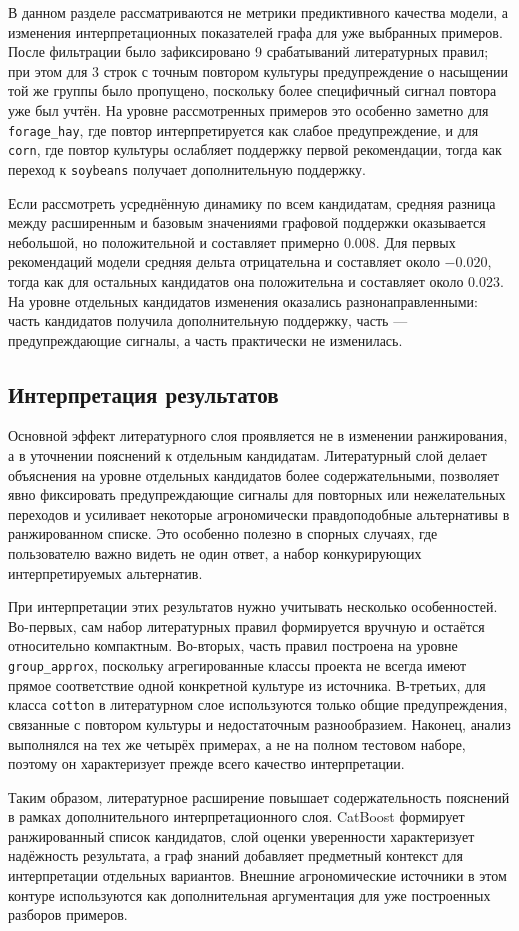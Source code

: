 

В данном разделе рассматриваются не метрики предиктивного качества модели, а изменения интерпретационных показателей
графа для уже выбранных примеров. После фильтрации было зафиксировано 9 срабатываний литературных правил; при этом для 3 строк с
точным повтором культуры предупреждение о насыщении той же группы было пропущено, поскольку более специфичный сигнал
повтора уже был учтён. На уровне рассмотренных примеров это особенно заметно для \texttt{forage\_hay}, где повтор
интерпретируется как слабое предупреждение, и для \texttt{corn}, где повтор культуры ослабляет поддержку первой
рекомендации, тогда как переход к \texttt{soybeans} получает дополнительную поддержку.

Если рассмотреть усреднённую динамику по всем кандидатам, средняя разница между расширенным и базовым значениями
графовой поддержки оказывается небольшой, но положительной и составляет примерно 0.008. Для первых рекомендаций
модели средняя дельта отрицательна и составляет около $-0.020$, тогда как для остальных кандидатов она положительна
и составляет около 0.023. На уровне отдельных кандидатов изменения оказались разнонаправленными: часть кандидатов
получила дополнительную поддержку, часть --- предупреждающие сигналы, а часть практически не изменилась.

\subsection{Интерпретация результатов}

Основной эффект литературного слоя проявляется не в изменении ранжирования, а в уточнении пояснений к отдельным кандидатам.
Литературный слой делает объяснения на уровне
отдельных кандидатов более содержательными, позволяет явно фиксировать предупреждающие сигналы для повторных или
нежелательных переходов и усиливает некоторые агрономически правдоподобные альтернативы в ранжированном списке.
Это особенно полезно в спорных случаях, где пользователю важно видеть не один ответ, а набор конкурирующих
интерпретируемых альтернатив.

При интерпретации этих результатов нужно учитывать несколько особенностей. Во-первых, сам набор литературных правил формируется вручную и
остаётся относительно компактным. Во-вторых, часть правил построена на уровне \texttt{group\_approx}, поскольку
агрегированные классы проекта не всегда имеют прямое соответствие одной конкретной культуре из источника.
В-третьих, для класса \texttt{cotton} в литературном слое используются только общие предупреждения, связанные с
повтором культуры и недостаточным разнообразием. Наконец, анализ выполнялся на тех же четырёх примерах, а не на
полном тестовом наборе, поэтому он характеризует прежде всего качество интерпретации.

Таким образом, литературное расширение повышает содержательность пояснений в рамках дополнительного
интерпретационного слоя. CatBoost формирует ранжированный список кандидатов, слой оценки уверенности характеризует
надёжность результата, а граф знаний добавляет предметный контекст для интерпретации отдельных вариантов. Внешние
агрономические источники в этом контуре используются как дополнительная аргументация для уже построенных разборов
примеров.
